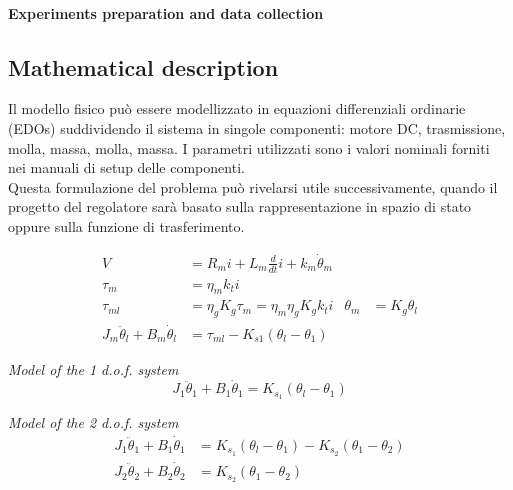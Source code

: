 \paragraph{Experiments preparation and data collection}


\subsection{Mathematical description}

Il modello fisico può essere modellizzato in equazioni differenziali ordinarie (EDOs) suddividendo il sistema in singole componenti: motore DC, trasmissione, molla, massa, molla, massa. I parametri utilizzati sono i valori nominali forniti nei manuali di setup delle componenti. \\
Questa formulazione del problema può rivelarsi utile successivamente, quando il progetto del regolatore sarà basato sulla rappresentazione in spazio di stato oppure sulla funzione di trasferimento.



\begin{subequations}
	\begin{align}
		V &= R_m i + L_m \frac{d}{dt}i + k_m \dot{\theta}_m \\
		\tau_m &= \eta_m k_t i \\
		\tau_{ml} &= \eta_g K_g \tau_m = \eta_m \eta_g K_g k_t i & \theta_m &= K_g \theta_l \\
		J_m \ddot{\theta}_l + B_m \dot{\theta}_l &= \tau_{ml} - K_{s1} ( \theta_l - \theta_1 )
		\label{model_equations}
	\end{align}
\end{subequations}

\textit{Model of the 1 d.o.f. system}
\begin{equation}
	J_1 \ddot{\theta}_1 + B_1 \dot{\theta}_1 = K_{s_1} ( \theta_l - \theta_1 )
\end{equation}

\textit{Model of the 2 d.o.f. system}
\begin{subequations}
	\begin{align}
		J_1 \ddot{\theta}_1 + B_1 \dot{\theta}_1 &= K_{s_1} ( \theta_l - \theta_1 ) - K_{s_2} ( \theta_1 - \theta_2 ) \\
		J_2 \ddot{\theta}_2 + B_2 \dot{\theta}_2 &= K_{s_2} ( \theta_1 - \theta_2 )
	\end{align}
\end{subequations}

